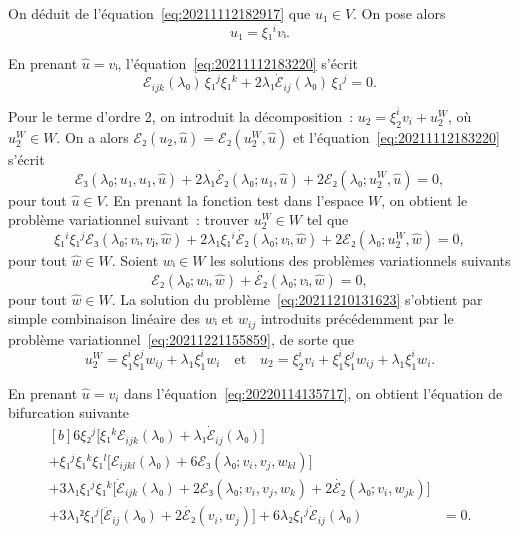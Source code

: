 \documentclass[12pt, final]{amsart}
\begin{document}
On déduit de l'équation~\eqref{eq:20211112182917} que \(u₁∈V\). On pose alors
\begin{equation}
  \label{eq:20220124135236}
  u₁=ξ₁^i vᵢ.
\end{equation}

En prenant \(\hat{u}=vᵢ\), l'équation~\eqref{eq:20211112183220} s'écrit
\begin{equation}
  ℰ_{ijk}(λ₀)\,ξ₁^jξ₁^k+2λ₁\dot{ℰ}_{ij}(λ₀)\,ξ₁^j=0.
\end{equation}

Pour le terme d'ordre 2, on introduit la décomposition~:
\(u_2=ξ_2^iv_i+u_2^W\), où \(u_2^W∈W\). On a alors
\(ℰ₂(u_2, \hat{u})=ℰ₂(u_2^W, \hat{u})\) et l'équation~\eqref{eq:20211112183220}
s'écrit
\begin{equation}
  ℰ₃(λ₀; u₁, u₁, \hat{u})+2λ₁\dot{ℰ₂}(λ₀; u₁, \hat{u})
  +2ℰ₂(λ₀; u_2^W, \hat{u})=0,
\end{equation}
pour tout \(\hat{u}∈V\). En prenant la fonction test dans l'espace \(W\), on
obtient le problème variationnel suivant~: trouver \(u_2^W∈W\) tel que
\begin{equation}
  \label{eq:20211210131623}
  ξ₁^iξ₁^jℰ₃(λ₀; vᵢ, vⱼ, \hat{w})
  +2λ₁ξ₁^i\dot{ℰ₂}(λ₀; vᵢ, \hat{w})
  +2ℰ₂(λ₀; u_2^W, \hat{w})=0,
\end{equation}
pour tout \(\hat{w}∈W\). Soient \(wᵢ∈W\) les solutions des problèmes
variationnels suivants
\begin{equation}
  \label{eq:20220208143055}
  ℰ₂(λ₀; wᵢ, \hat{w})+\dot{ℰ₂}(λ₀; vᵢ, \hat{w})=0,
\end{equation}
pour tout \(\hat{w}∈W\). La solution du problème~\eqref{eq:20211210131623}
s'obtient par simple combinaison linéaire des \(wᵢ\) et \(w_{ij}\) introduits
précédemment par le problème variationnel~\eqref{eq:20211221155859}, de sorte
que
\begin{equation}
  \label{eq:20220124135324}
  u_2^W=ξ_1^iξ_1^jw_{ij}+λ_1ξ_1^i w_i
  \quad\text{et}\quad
  u_2=ξ_2^iv_i+ξ_1^iξ_1^jw_{ij}+λ_1ξ_1^i w_i.
\end{equation}

En prenant \(\hat{u}=v_i\) dans l'équation~\eqref{eq:20220114135717}, on
obtient l'équation de bifurcation suivante
\begin{equation}
  \label{eq:20220210143805}
  \begin{aligned}[b]
    6ξ₂^j\bigl[ξ₁^kℰ_{ijk}(λ₀)+λ₁\dot{ℰ}_{ij}(λ₀)\bigr]&\\
    +ξ₁^jξ₁^kξ₁^l\bigl[ℰ_{ijkl}(λ₀)+6ℰ₃(λ₀; v_i, v_j, w_{kl})\bigr]&\\
    +3λ₁ξ₁^jξ₁^k\bigl[\dot{ℰ}_{ijk}(λ₀)+2ℰ₃(λ₀; v_i, v_j, w_k)
    +2\dot{ℰ₂}(λ₀; v_i, w_{jk})\bigr]&\\
    +3λ₁²ξ₁^j\bigl[\ddot{ℰ}_{ij}(λ₀)+2\dot{ℰ₂}(v_i, w_j)\bigr]
    +6λ₂ξ₁^j\dot{ℰ}_{ij}(λ₀)
    &=0.
  \end{aligned}
\end{equation}
\end{document}
